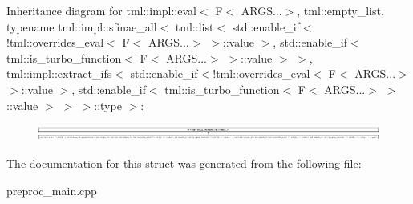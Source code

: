 Inheritance diagram for tml\+:\+:impl\+:\+:eval$<$ F$<$ A\+R\+G\+S...$>$, tml\+:\+:empty\+\_\+list, typename tml\+:\+:impl\+:\+:sfinae\+\_\+all$<$ tml\+:\+:list$<$ std\+:\+:enable\+\_\+if$<$!tml\+:\+:overrides\+\_\+eval$<$ F$<$ A\+R\+G\+S...$>$ $>$\+:\+:value $>$, std\+:\+:enable\+\_\+if$<$ tml\+:\+:is\+\_\+turbo\+\_\+function$<$ F$<$ A\+R\+G\+S...$>$ $>$\+:\+:value $>$ $>$, tml\+:\+:impl\+:\+:extract\+\_\+ifs$<$ std\+:\+:enable\+\_\+if$<$!tml\+:\+:overrides\+\_\+eval$<$ F$<$ A\+R\+G\+S...$>$ $>$\+:\+:value $>$, std\+:\+:enable\+\_\+if$<$ tml\+:\+:is\+\_\+turbo\+\_\+function$<$ F$<$ A\+R\+G\+S...$>$ $>$\+:\+:value $>$ $>$ $>$\+:\+:type $>$\+:\begin{figure}[H]
\begin{center}
\leavevmode
\includegraphics[height=0.535885cm]{structtml_1_1impl_1_1eval_3_01F_3_01ARGS_8_8_8_4_00_01tml_1_1empty__list_00_01typename_01tml_1_1dd86f48519e9081cff15e8e8e117a03a}
\end{center}
\end{figure}


The documentation for this struct was generated from the following file\+:\begin{DoxyCompactItemize}
\item 
preproc\+\_\+main.\+cpp\end{DoxyCompactItemize}

